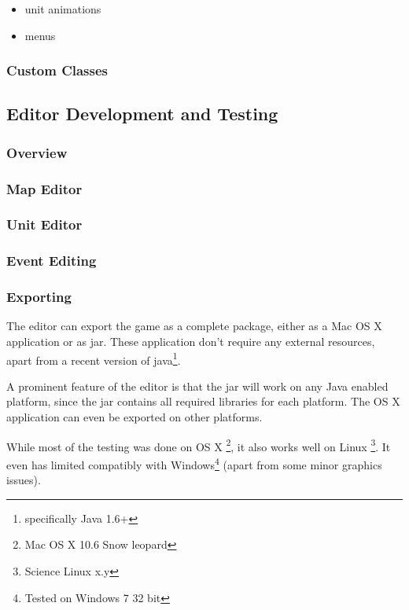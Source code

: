 \begin{itemize}
	\item unit animations
	\item menus
\end{itemize}

\subsubsection{Custom Classes} %
\label{ssub:custom_classes}


\subsection{Editor Development and Testing}

\subsubsection{Overview}
\label{ssub:overview}

\subsubsection{Map Editor}
\label{ssub:map_editor}

\subsubsection{Unit Editor}
\label{ssub:unit_editors}

\subsubsection{Event Editing}

\subsubsection{Exporting}
\label{ssub:exporting}

The editor can export the game as a complete package, either as a Mac OS X application or as jar. These application don't require any external resources, apart from a recent version of java\footnote{specifically Java 1.6+}.

A prominent feature of the editor is that the jar will work on any Java enabled platform, since the jar contains all required libraries for each platform. The OS X application can even be exported on other platforms.

While most of the testing was done on OS X \footnote{Mac OS X 10.6 Snow leopard}, it also works well on Linux \footnote{Science  Linux x.y}. It even has limited compatibly with Windows\footnote{Tested on Windows 7 32 bit} (apart from some minor graphics issues).
